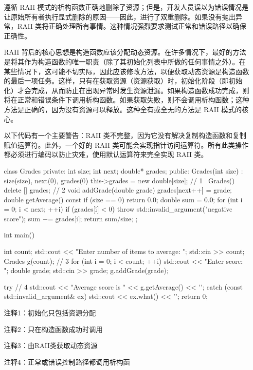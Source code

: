 遵循 RAII 模式的析构函数正确地删除了资源；但是，开发人员误以为错误情况是让原始所有者执行显式删除的原因——因此，进行了双重删除。如果没有抛出异常，RAII 类将正确处理所有事情。这种情况强烈要求测试正常和错误路径以确保正确性。


RAII 背后的核心思想是构造函数应该分配动态资源。在许多情况下，最好的方法是将其作为构造函数的唯一职责（除了其初始化列表中所做的任何事情之外）。在某些情况下，这可能不切实际，因此应该修改方法，以便获取动态资源是构造函数的最后一项任务。这样，只有在获取资源（资源获取）时，初始化阶段（即初始化）才会完成，从而防止在出现异常时发生资源泄漏。如果构造函数成功完成，则将在正常和错误条件下调用析构函数。如果获取失败，则不会调用析构函数；这种方法是正确的，因为没有资源可以释放。这种全有或全无的方法是 RAII 模式的核心。

以下代码有一个主要警告：RAII 类不完整，因为它没有解决复制构造函数和复制赋值运算符。此外，一个好的 RAII 类可能会实现指针访问运算符。所有此类操作都必须进行编码以防止灾难，使用默认运算符来完全实现 RAII 类。


\begin{cpp}
class Grades {
private:
  int size;
  int next;
  double* grades;
public:
  Grades(int size) : size(size), next(0), grades(0) {
    this->grades = new double[size]; // 1
  }
  ~Grades() { delete [] grades; } // 2
  void addGrade(double grade) { grades[next++] = grade; }
    double getAverage() const {
    if (size == 0)
      return 0.0;
    double sum = 0.0;
    for (int i = 0; i < next; ++i) {
      if (grades[i] < 0)
        throw std::invalid_argument("negative score");
      sum += grades[i];
    }
    return sum/size;
  }
};

int main() {
  int count;
  std::cout << "Enter number of items to average: ";
  std::cin >> count;
  Grades g(count); // 3
  for (int i = 0; i < count; ++i) {
    std::cout << "Enter score: ";
    double grade;
    std::cin >> grade;
    g.addGrade(grade);
  }

  try { // 4
    std::cout << "Average score is " << g.getAverage() << '\n';
  } catch (const std::invalid_argument& ex) {
    std::cout << ex.what() << '\n';
  }
  return 0;
}
\end{cpp}

{\footnotesize
注释1：初始化只包括资源分配

注释2：只在构造函数成功时调用

注释3：由RAII类获取动态资源

注释4：正常或错误控制路径都调用析构函
}

